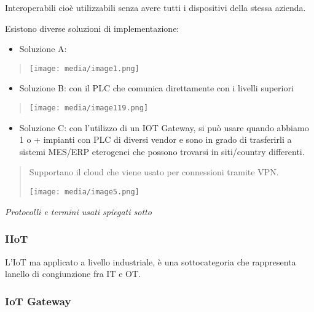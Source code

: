 Interoperabili cioè utilizzabili senza avere tutti i dispositivi della
stessa azienda.

Esistono diverse soluzioni di implementazione:

\begin{itemize}
\item
  Soluzione A:
\end{itemize}

\begin{quote}
\texttt{[image: media/image1.png]}
\end{quote}

\begin{itemize}
\item
  Soluzione B: con il PLC che comunica direttamente con i livelli
  superiori
\end{itemize}

\begin{quote}
\texttt{[image: media/image119.png]}
\end{quote}

\begin{itemize}
\item
  Soluzione C: con l'utilizzo di un IOT Gateway, si può usare quando
  abbiamo 1 o + impianti con PLC di diversi vendor e sono in grado di
  trasferirli a sistemi MES/ERP eterogenei che possono trovarsi in
  siti/country differenti.
\end{itemize}

\begin{quote}
Supportano il cloud che viene usato per connessioni tramite VPN.

\texttt{[image: media/image5.png]}
\end{quote}

\emph{Protocolli e termini usati spiegati sotto}

\subsubsection{IIoT}\label{iiot}

L'IoT ma applicato a livello industriale, è una sottocategoria che
rappresenta l\textquotesingle anello di congiunzione fra IT e OT.

\subsubsection{IoT Gateway}\label{iot-gateway}

